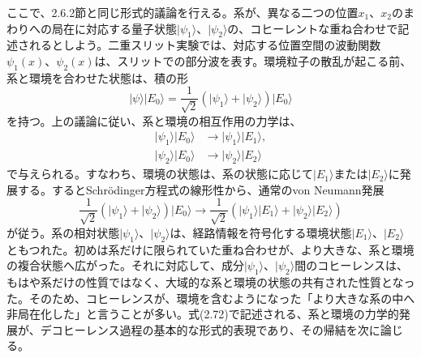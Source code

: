 ここで、2.6.2節と同じ形式的議論を行える。系が、異なる二つの位置$x_1$、$x_2$のまわりへの局在に対応する量子状態$\lvert\psi_1\rangle$、$\lvert\psi_2\rangle$の、コヒーレントな重ね合わせで記述されるとしよう。二重スリット実験では、対応する位置空間の波動関数$\psi_1(x)$、$\psi_2(x)$は、スリットでの部分波を表す。環境粒子の散乱が起こる前、系と環境を合わせた状態は、積の形
\begin{equation}\lvert\psi\rangle\lvert E_0\rangle=\frac1{\sqrt2}(\lvert\psi_1\rangle+\lvert\psi_2\rangle)\lvert E_0\rangle\tag{2.70}\end{equation}
を持つ。上の議論に従い、系と環境の相互作用の力学は、
\begin{align}\lvert\psi_1\rangle\lvert E_0\rangle&\longrightarrow\lvert\psi_1\rangle\lvert E_1\rangle,\tag{2.71a}\\\lvert\psi_2\rangle\lvert E_0\rangle&\longrightarrow\lvert\psi_2\rangle\lvert E_2\rangle\tag{2.71b}\end{align}
で与えられる。すなわち、環境の状態は、系の状態に応じて$\lvert E_1\rangle$または$\lvert E_2\rangle$に発展する。するとSchrödinger方程式の線形性から、通常のvon Neumann発展
\begin{equation}\frac1{\sqrt2}(\lvert\psi_1\rangle+\lvert\psi_2\rangle)\lvert E_0\rangle\longrightarrow\frac1{\sqrt2}(\lvert\psi_1\rangle\lvert E_1\rangle+\lvert\psi_2\rangle\lvert E_2\rangle)\tag{2.72}\end{equation}
が従う。系の相対状態$\lvert\psi_1\rangle$、$\lvert\psi_2\rangle$は、経路情報を符号化する環境状態$\lvert E_1\rangle$、$\lvert E_2\rangle$ともつれた。初めは系だけに限られていた重ね合わせが、より大きな、系と環境の複合状態へ広がった。それに対応して、成分$\lvert\psi_1\rangle$、$\lvert\psi_2\rangle$間のコヒーレンスは、もはや系だけの性質ではなく、大域的な系と環境の状態の共有された性質となった。そのため、コヒーレンスが、環境を含むようになった「より大きな系の中へ非局在化した」\cite[p.~5]{ref077}と言うことが多い。式(2.72)で記述される、系と環境の力学的発展が、デコヒーレンス過程の基本的な形式的表現であり、その帰結を次に論じる。

